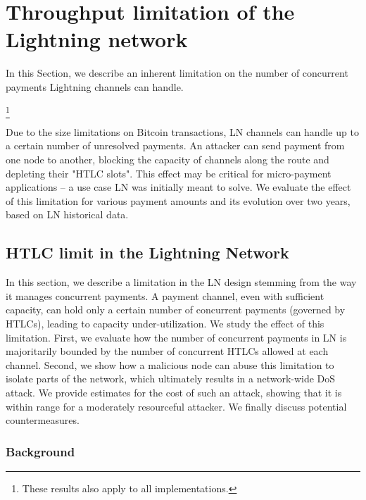 \chapter{Throughput limitation of the Lightning network}

\label{Chapter08HTLClimit}

In this Section, we describe an inherent limitation on the number of concurrent payments Lightning channels can handle.

\footnote{These results also apply to all implementations.}

Due to the size limitations on Bitcoin transactions, LN channels can handle up to a certain number of unresolved payments.
An attacker can send payment from one node to another, blocking the capacity of channels along the route and depleting their "HTLC slots".
This effect may be critical for micro-payment applications -- a use case LN was initially meant to solve.
We evaluate the effect of this limitation for various payment amounts and its evolution over two years, based on LN historical data.

\section{HTLC limit in the Lightning Network}
\label{sec:attack}

In this section, we describe a limitation in the LN design 
stemming from the way it manages concurrent payments. 
A payment channel, even with sufficient capacity, can hold only 
a certain number of concurrent payments (governed by HTLCs), leading to capacity under-utilization. 
We study the effect of this limitation.
First, we evaluate how the number of concurrent payments in LN 
is majoritarily bounded by the number of concurrent HTLCs allowed at each channel. 
Second, we show how a malicious node can abuse this 
limitation to isolate parts of the network, 
which ultimately results in a network-wide DoS attack.
We provide estimates for the cost of such an attack, showing that it is within range for a moderately resourceful attacker. 
We finally discuss potential countermeasures.

\subsection{Background} \label{max-htlc-background}

